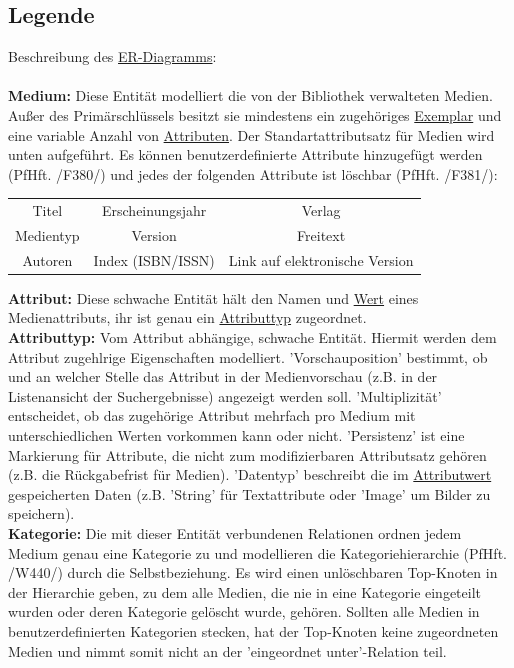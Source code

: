 \documentclass{article}
\begin{document}
\restoregeometry
\newpage

\subsection{Legende}
Beschreibung des \hyperlink{ERDia}{ER-Diagramms}: \\
\\
\textbf{Medium:} Diese Entität modelliert die von der Bibliothek verwalteten Medien. Außer des Primärschlüssels besitzt sie mindestens ein zugehöriges \hyperlink{Exemplarentität}{Exemplar} und eine variable Anzahl von \hyperlink{Attributentität}{Attributen}. Der \hypertarget{Standartattributsatz}{Standartattributsatz} für Medien wird unten aufgeführt. Es können benutzerdefinierte Attribute hinzugefügt werden (PfHft. /F380/) und jedes der folgenden Attribute ist löschbar (PfHft. /F381/):
\begin{center}
\begin{tabular} { c c c }
Titel & Erscheinungsjahr &  Verlag \\
 Medientyp & Version &  Freitext \\
 Autoren &  Index (ISBN/ISSN) &  Link auf elektronische Version \\
\end{tabular}
\end{center}
\textbf{\hypertarget{Attributentität}{Attribut}:} Diese schwache Entität hält den Namen und \hyperlink{Attribut-wertattribut}{Wert} eines Medienattributs, ihr ist genau ein \hyperlink{Attributtypentität}{Attributtyp} zugeordnet.\\
\textbf{\hypertarget{Attributtypentität}{Attributtyp}:} Vom Attribut abhängige, schwache Entität. Hiermit werden dem Attribut zugehlrige Eigenschaften modelliert. 'Vorschauposition' bestimmt, ob und an welcher Stelle das Attribut in der Medienvorschau (z.B. in der Listenansicht der Suchergebnisse) angezeigt werden soll. 'Multiplizität' entscheidet, ob das zugehörige Attribut mehrfach pro Medium mit unterschiedlichen Werten vorkommen kann oder nicht. 'Persistenz' ist eine Markierung für Attribute, die nicht zum modifizierbaren Attributsatz gehören (z.B. die Rückgabefrist für Medien). 'Datentyp' beschreibt die im \hyperlink{Attribut-wertattribut}{Attributwert} gespeicherten Daten (z.B. 'String' für Textattribute oder 'Image' um Bilder zu speichern). \\
\textbf{Kategorie:} Die mit dieser Entität verbundenen Relationen ordnen jedem Medium genau eine Kategorie zu und modellieren die Kategoriehierarchie (PfHft. /W440/) durch die Selbstbeziehung. Es wird einen unlöschbaren Top-Knoten in der Hierarchie geben, zu dem alle Medien, die nie in eine Kategorie eingeteilt wurden oder deren Kategorie gelöscht wurde, gehören. Sollten alle Medien in benutzerdefinierten Kategorien stecken, hat der Top-Knoten keine zugeordneten Medien und nimmt somit nicht an der 'eingeordnet unter'-Relation teil.\\
\end{document}
